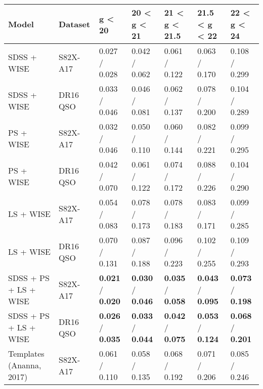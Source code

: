 \begin{table*}
    \centering
    \begin{tabular}{lllllll}
    \hline
                        Model &   Dataset &                           g < 20 &                      20 < g < 21 &                    21 < g < 21.5 &                    21.5 < g < 22 &                      22 < g < 24 \\
    \hline
                  SDSS + WISE &  S82X-A17 &                    0.027 / 0.028 &                    0.042 / 0.062 &                    0.061 / 0.122 &                    0.063 / 0.170 &                    0.108 / 0.299 \\
                  SDSS + WISE &  DR16 QSO &                    0.033 / 0.046 &                    0.046 / 0.081 &                    0.062 / 0.137 &                    0.078 / 0.200 &                    0.104 / 0.289 \\
                    PS + WISE &  S82X-A17 &                    0.032 / 0.046 &                    0.050 / 0.110 &                    0.060 / 0.144 &                    0.082 / 0.221 &                    0.099 / 0.295 \\
                    PS + WISE &  DR16 QSO &                    0.042 / 0.070 &                    0.061 / 0.122 &                    0.074 / 0.172 &                    0.088 / 0.226 &                    0.104 / 0.290 \\
                    LS + WISE &  S82X-A17 &                    0.054 / 0.083 &                    0.078 / 0.173 &                    0.078 / 0.183 &                    0.083 / 0.171 &                    0.099 / 0.285 \\
                    LS + WISE &  DR16 QSO &                    0.070 / 0.131 &                    0.087 / 0.188 &                    0.096 / 0.223 &                    0.102 / 0.255 &                    0.109 / 0.293 \\
        SDSS + PS + LS + WISE &  S82X-A17 &  \textbf{0.021} / \textbf{0.020} &  \textbf{0.030} / \textbf{0.046} &  \textbf{0.035} / \textbf{0.058} &  \textbf{0.043} / \textbf{0.095} &  \textbf{0.073} / \textbf{0.198} \\
        SDSS + PS + LS + WISE &  DR16 QSO &  \textbf{0.026} / \textbf{0.035} &  \textbf{0.033} / \textbf{0.044} &  \textbf{0.042} / \textbf{0.075} &  \textbf{0.053} / \textbf{0.124} &  \textbf{0.068} / \textbf{0.201} \\
     Templates (Ananna, 2017) &  S82X-A17 &                    0.061 / 0.110 &                    0.058 / 0.135 &                    0.068 / 0.192 &                    0.071 / 0.206 &                    0.085 / 0.246 \\

\end{tabular}
\end{table*}
